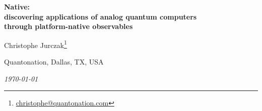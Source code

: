 \documentclass[10pt]{article}
\begin{document}
\begin{center}
  {\Large\bfseries Native:}\\[0.25em]
  {\Large\bfseries discovering applications of analog quantum computers}\\[0.25em]
  {\Large\bfseries through platform-native observables}

  \vspace{1em}

  {\large Christophe Jurczak\footnote{\href{mailto:christophe@quantonation.com}{christophe@quantonation.com}} }

  \vspace{0.4em}

  {\footnotesize Quantonation, Dallas, TX, USA}

  \vspace{0.4em}

  {\footnotesize\itshape \today}

  \vspace{1em}


\end{center}
\end{document}
